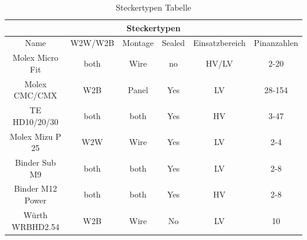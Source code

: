 \begin{table}
	\label{tab:steckertypen}
	\caption{Steckertypen Tabelle}
\begin{tabular}{|c|c|c|c|c|c|}
	
	\hline
	\multicolumn{6}{|c|}{Steckertypen} \\
	\hline
	Name & W2W/W2B & Montage & Sealed & Einsatzbereich & Pinanzahlen \\
	\hline
	Molex Micro Fit & both & Wire & no & HV/LV & 2-20 \\
	\hline
	Molex CMC/CMX & W2B & Panel & Yes & LV  & 28-154 \\
	\hline
	TE HD10/20/30 & both & both & Yes & HV & 3-47 \\
	\hline
	Molex Mizu P 25 & W2W & Wire & Yes & LV & 2-4 \\
	\hline
	Binder Sub M9 & both & both & Yes & LV & 2-8 \\
	\hline
	Binder M12 Power & both & both & Yes & HV & 2-8 \\
	\hline
	Würth WRBHD2.54 & W2B & Wire & No & LV & 10 \\
	\hline
\end{tabular}
\end{table}

